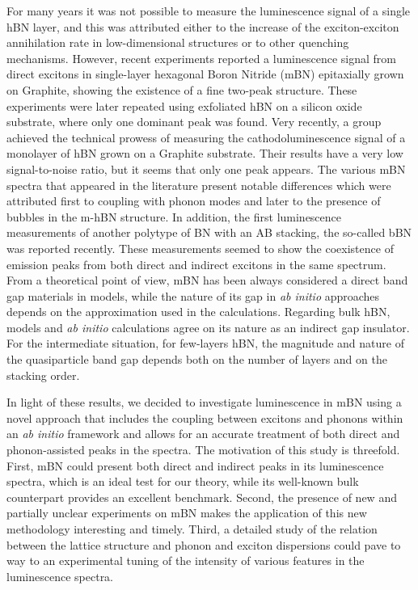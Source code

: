 For many years it was not possible to measure the luminescence signal of a single hBN layer,\cite{schue2016dimensionality} and this was attributed either to the increase of the exciton-exciton annihilation rate in low-dimensional structures\cite{yuan2015exciton,plaud2019exciton} or to other quenching mechanisms.
However, recent experiments reported a luminescence signal from direct excitons in single-layer hexagonal Boron Nitride (mBN) epitaxially grown on Graphite, showing the existence of a fine two-peak structure.\cite{elias2019direct,wang2022scalable} These experiments were later repeated using exfoliated hBN on a silicon oxide substrate,\cite{rousseau2021monolayer} where only one dominant peak was found. Very recently, a group achieved the technical prowess of measuring the cathodoluminescence signal of a monolayer of hBN grown on a Graphite substrate.\cite{shima2023cathodoluminescence} Their results have a very low signal-to-noise ratio, but it seems that only one peak appears.
The various mBN spectra that appeared in the literature present notable differences which were attributed first to coupling with phonon modes and later to the presence of bubbles in the m-hBN structure.
In addition, the first luminescence measurements of another polytype of BN with an AB stacking, the so-called \acrfull{bBN} was reported recently.\cite{rousseau2022bernal, rousseau2022phonon}
These measurements seemed to show the coexistence of emission peaks from both direct and indirect excitons in the same spectrum.
From a theoretical point of view, mBN has been always considered a direct band gap materials in models\cite{galvani2016excitons}, while the nature of its gap in \emph{ab initio} approaches depends on the approximation used in the calculations.\cite{prete2020giant,mengle2019impact} Regarding bulk hBN, models and \emph{ab initio} calculations agree on its nature as an indirect gap insulator.\cite{sponza2018direct}
For the intermediate situation, for few-layers hBN, the magnitude and nature of the quasiparticle band gap depends both on the number of layers and on the stacking order.\cite{sponza2018direct,mengle2019impact,latil2022electronic}

In light of these results, we decided to investigate luminescence in mBN using a novel approach that includes the coupling between excitons and phonons within an \emph{ab initio} framework and allows for an accurate treatment of both direct and phonon-assisted peaks in the spectra.
The motivation of this study is threefold.
First, mBN could present both direct and indirect peaks in its luminescence spectra, which is an ideal test for our theory, while its well-known bulk counterpart provides an excellent benchmark.
Second, the presence of new and partially unclear experiments on \acrshort{mBN} makes the application of this new methodology interesting and timely.
Third, a detailed study of the relation between the lattice structure and phonon and exciton dispersions could pave to way to an experimental tuning of the intensity of various features in the luminescence spectra.  


